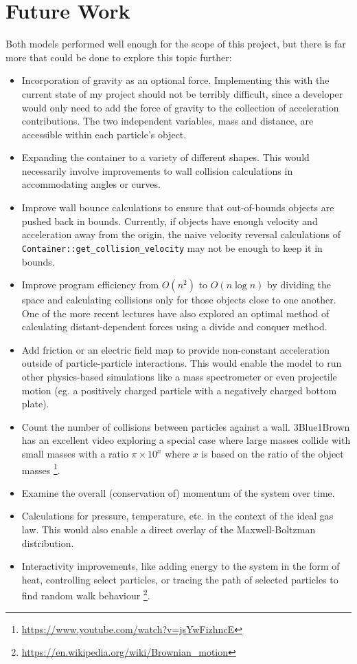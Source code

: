 \documentclass{article}
\begin{document}
\section{Future Work}
Both models performed well enough for the scope of this project,
but there is far more that could be done to explore this topic further:
\begin{itemize}
    \item Incorporation of gravity as an optional force.
    Implementing this with the current state of my project should not be terribly difficult,
    since a developer would only need to add the force of gravity to the collection of acceleration contributions.
    The two independent variables, mass and distance, are accessible within each particle's object.
    \item Expanding the container to a variety of different shapes.
    This would necessarily involve improvements to wall collision calculations in accommodating angles or curves.
    \item Improve wall bounce calculations to ensure that out-of-bounds objects are pushed back in bounds.
    Currently, if objects have enough velocity and acceleration away from the origin, the naive velocity reversal
    calculations of \texttt{Container::get\_collision\_velocity} may not be enough to keep it in bounds.
    \item Improve program efficiency from $O(n^2)$ to $O(n\log{n})$ by dividing the space
    and calculating collisions only for those objects close to one another.
    One of the more recent lectures have also explored an optimal
    method of calculating distant-dependent forces using a divide and conquer method.
    \item Add friction or an electric field map to provide non-constant acceleration outside of particle-particle interactions.
    This would enable the model to run other physics-based simulations like a mass spectrometer or even projectile motion
    (eg. a positively charged particle with a negatively charged bottom plate).
    \item Count the number of collisions between particles against a wall.
    3Blue1Brown has an excellent video exploring a special case where large
    masses collide with small masses with a ratio $\pi\times 10^x$ where $x$ is based on the ratio of the object masses
    \footnote{\url{https://www.youtube.com/watch?v=jsYwFizhncE}}.
    \item Examine the overall (conservation of) momentum of the system over time.
    \item Calculations for pressure, temperature, etc. in the context of the ideal gas law.
    This would also enable a direct overlay of the Maxwell-Boltzman distribution.
    \item Interactivity improvements, like adding energy to the system in the form of heat, controlling select particles,
    or tracing the path of selected particles to find random walk behaviour
    \footnote{\url{https://en.wikipedia.org/wiki/Brownian_motion}}.
\end{itemize}
\end{document}
